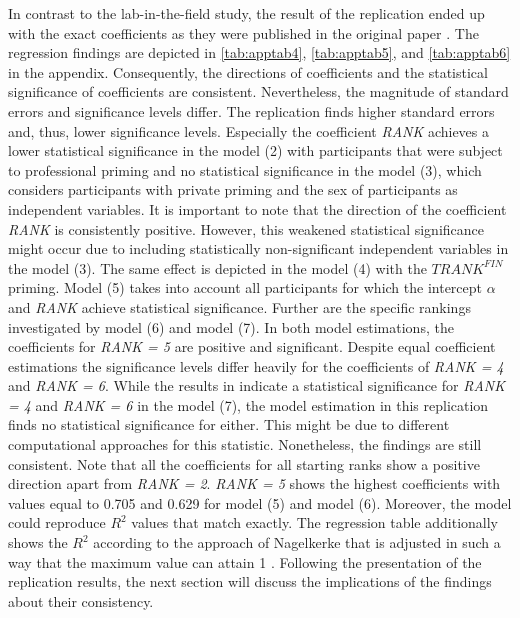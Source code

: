 \documentclass[12pt]{article}
\begin{document}
In contrast to the lab-in-the-field study, the result of the replication ended up with the exact coefficients as they were published in the original paper \parencite[p.~2295]{Kirchler2018}. The regression findings are depicted in \autoref{tab:apptab4}, \autoref{tab:apptab5}, and \autoref{tab:apptab6} in the appendix. Consequently, the directions of coefficients and the statistical significance of coefficients are consistent. Nevertheless, the magnitude of standard errors and significance levels differ. The replication finds higher standard errors and, thus, lower significance levels. Especially the coefficient \textit{RANK} achieves a lower statistical significance in the model (2) with participants that were subject to professional priming and no statistical significance in the model (3), which considers participants with private priming and the sex of participants as independent variables. It is important to note that the direction of the coefficient \textit{RANK} is consistently positive. However, this weakened statistical significance might occur due to including statistically non-significant independent variables in the model (3). The same effect is depicted in the model (4) with the \textit{$TRANK^{FIN}$} priming. Model (5) takes into account all participants for which the intercept $\alpha$ and \textit{RANK} achieve statistical significance. Further are the specific rankings investigated by model (6) and model (7). In both model estimations, the coefficients for \textit{RANK = 5} are positive and significant. Despite equal coefficient estimations the significance levels differ heavily for the coefficients of  \textit{RANK = 4} and \textit{RANK = 6}. While the results in \textcite[p.~2295]{Kirchler2018} indicate a statistical significance for \textit{RANK = 4} and \textit{RANK = 6} in the model (7), the model estimation in this replication finds no statistical significance for either. This might be due to different computational approaches for this statistic. Nonetheless, the findings are still consistent. Note that all the coefficients for all starting ranks show a positive direction apart from \textit{RANK = 2}.  \textit{RANK = 5} shows the highest coefficients with values equal to 0.705 and 0.629 for model (5) and model (6). Moreover, the model could reproduce $R^{2}$ values that match exactly. The regression table additionally shows the $R^{2}$ according to the approach of Nagelkerke that is adjusted in such a way that the maximum value can attain 1 \parencite[p.~503]{Cohen2003}.
Following the presentation of the replication results, the next section will discuss the implications of the findings about their consistency.
\end{document}

